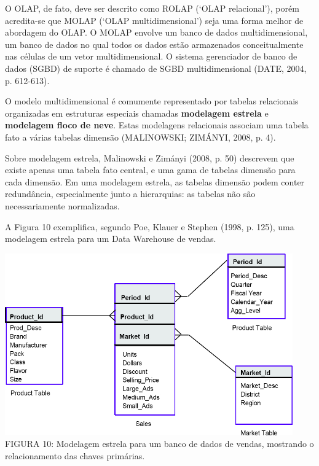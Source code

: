 \documentclass[a4paper]{article}
\begin{document}
{
\textsf{O OLAP, de fato, deve ser descrito como ROLAP (`OLAP relacional'), por\'em acredita-se que MOLAP (`OLAP
multidimensional') seja uma forma melhor de abordagem do OLAP. O MOLAP envolve um banco de dados multidimensional, um
banco de dados no qual todos os dados est\~ao armazenados conceitualmente nas c\'elulas de um vetor multidimensional. O
sistema gerenciador de banco de dados (SGBD) de suporte \'e chamado de SGBD multidimensional (DATE, 2004, p.
612-613).}}

{
\textsf{O modelo multidimensional \'e comumente representado por tabelas relacionais organizadas em estruturas especiais
chamadas }\textsf{\textbf{modelagem estrela}}\textsf{ e }\textsf{\textbf{modelagem floco de neve}}\textsf{. Estas
modelagens relacionais associam uma tabela fato a v\'arias tabelas dimens\~ao (MALINOWSKI; ZIM\'ANYI, 2008, p. 4). }}

{
\textsf{Sobre modelagem estrela, Malinowski e Zim\'anyi (2008, p. 50) descrevem que existe apenas uma tabela fato
central, e uma gama de tabelas dimens\~ao para cada dimens\~ao. Em uma modelagem estrela, as tabelas dimens\~ao podem
conter redund\^ancia, especialmente junto a hierarquias: as tabelas n\~ao s\~ao necessariamente normalizadas.}}

{
\textsf{A Figura 10 exemplifica, segundo Poe, Klauer e Stephen (1998, p. 125), uma modelagem estrela para um Data
Warehouse de vendas.}}

{
 \includegraphics[width=12.386cm,height=7.833cm]{monograph-img010.jpg} \textsf{\MakeUppercase{ \newline
FIGURA }}\textsf{10: Modelagem estrela para um banco de dados de vendas, mostrando o relacionamento das chaves
prim\'arias. }}
\end{document}
